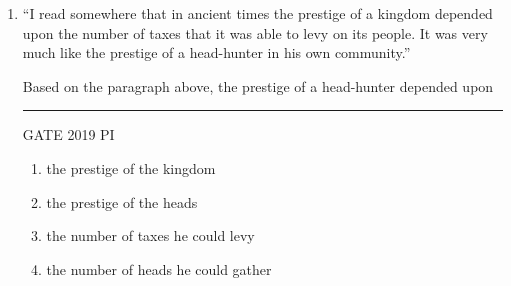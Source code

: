 \documentclass[journal,12pt,onecolumn]{IEEEtran}
\theoremstyle{remark}
\begin{document}
\begin{enumerate}
\hfill{GATE 2019 PI}

\begin{multicols}{2}
\begin{enumerate}
    \item 9
    \item 10
    \item 11
    \item 11.30
\end{enumerate}
\end{multicols}

\item ``I read somewhere that in ancient times the prestige of a kingdom depended upon the number of taxes that it was able to levy on its people. It was very much like the prestige of a head-hunter in his own community.''

Based on the paragraph above, the prestige of a head-hunter depended upon \rule{3cm}{0.15mm}

\hfill{GATE 2019 PI}

\begin{multicols}{2}
\begin{enumerate}
    \item the prestige of the kingdom
    \item the prestige of the heads
    \item the number of taxes he could levy
    \item the number of heads he could gather
\end{enumerate}
\end{multicols}

\end{enumerate}
\end{document}
